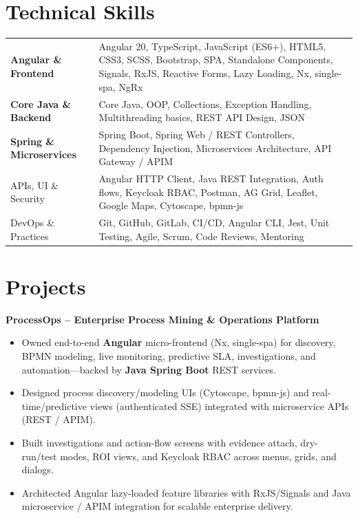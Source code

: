 \documentclass[a4paper,10pt]{article}
\newenvironment{projectblock}[1]
    {
    \textbf{#1}\\[1pt]
    \begin{minipage}[t]{\linewidth}
    \begin{itemize}[nosep, leftmargin=1em, itemsep=1pt,label=--]
    }
    {
    \end{itemize}
    \end{minipage}
    }
\begin{document}
\section{\textbf{Technical Skills}}

\renewcommand{\arraystretch}{1.05}
\begin{tabularx}{\linewidth}{@{}l X@{}}
\textbf{Angular \& Frontend} & Angular 20, TypeScript, JavaScript (ES6+), HTML5, CSS3, SCSS, Bootstrap, SPA, Standalone Components, Signals, RxJS, Reactive Forms, Lazy Loading, Nx, single-spa, NgRx \\[1pt]
\textbf{Core Java \& Backend} & Core Java, OOP, Collections, Exception Handling, Multithreading basics, REST API Design, JSON \\[1pt]
\textbf{Spring \& Microservices} & Spring Boot, Spring Web / REST Controllers, Dependency Injection, Microservices Architecture, API Gateway / APIM \\[1pt]
APIs, UI \& Security & Angular HTTP Client, Java REST Integration, Auth flows, Keycloak RBAC, Postman, AG Grid, Leaflet, Google Maps, Cytoscape, bpmn-js \\[1pt]
DevOps \& Practices & Git, GitHub, GitLab, CI/CD, Angular CLI, Jest, Unit Testing, Agile, Scrum, Code Reviews, Mentoring \\
\end{tabularx}


\section{\textbf{Projects}}

\begin{projectblock}{ProcessOps -- Enterprise Process Mining \& Operations Platform}
\item Owned end-to-end \textbf{Angular} micro-frontend (Nx, single-spa) for discovery, BPMN modeling, live monitoring, predictive SLA, investigations, and automation---backed by \textbf{Java Spring Boot} REST services.
\item Designed process discovery/modeling UIs (Cytoscape, bpmn-js) and real-time/predictive views (authenticated SSE) integrated with microservice APIs (REST / APIM).
\item Built investigations and action-flow screens with evidence attach, dry-run/test modes, ROI views, and Keycloak RBAC across menus, grids, and dialogs.
\item Architected Angular lazy-loaded feature libraries with RxJS/Signals and Java microservice / APIM integration for scalable enterprise delivery.
\end{projectblock}
\end{document}
